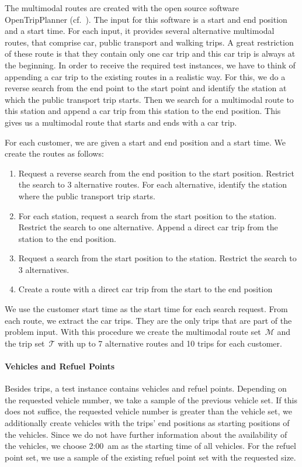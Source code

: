 The multimodal routes are created with the open source software OpenTripPlanner (cf.~\cite{OTP}). The input for this software is a start and end position and a start time. For each input, it provides several alternative multimodal routes, that comprise car, public transport and walking trips. A great restriction of these route is that they contain only one car trip and this car trip is always at the beginning. In order to receive the required test instances, we have to think of appending a car trip to the existing routes in a realistic way. For this, we do a reverse search from the end point to the start point and identify the station at which the public transport trip starts. Then we search for a multimodal route to this station and append a car trip from this station to the end position. This gives us a multimodal route that starts and ends with a car trip.

For each customer, we are given a start and end position and a start time. We create the routes as follows:
\begin{enumerate}
	\item Request a reverse search from the end position to the start position. Restrict the search to 3 alternative routes. For each alternative, identify the station where the public transport trip starts.
	\item For each station, request a search from the start position to the station. Restrict the search to one alternative. Append a direct car trip from the station to the end position.
	\item Request a search from the start position to the station. Restrict the search to 3 alternatives.
	\item Create a route with a direct car trip from the start to the end position
\end{enumerate}

We use the customer start time as the start time for each search request. From each route, we extract the car trips. They are the only trips that are part of the problem input. With this procedure we create the multimodal route set~$\mathcal{M}$ and the trip set~$\mathcal{T}$ with up to 7 alternative routes and 10 trips for each customer.

\paragraph{Vehicles and Refuel Points} \parfill

Besides trips, a test instance contains vehicles and refuel points. Depending on the requested vehicle number, we take a sample of the previous vehicle set. If this does not suffice, \ie the requested vehicle number is greater than the vehicle set, we additionally create vehicles with the trips' end positions as starting positions of the vehicles. Since we do not have further information about the availability of the vehicles, we choose 2:00~am as the starting time of all vehicles. For the refuel point set, we use a sample of the existing refuel point set with the requested size.

